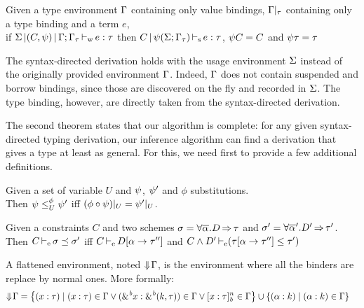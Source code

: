 \begin{theorem}
  Given a type environment $\E$ containing only value bindings,
  $\E|_\tau$ containing only a type binding and a term $e$,\\
  if $\inferW{\Sv}{(C,\unif)}{\E;\E_\tau}{e}{\tau}$
  then $\inferS{C}{\unif(\Sv;\E_\tau)}{e}{\tau}$, $\unif C = C$ and $\unif \tau = \tau$
\end{theorem}

The syntax-directed derivation holds with the usage environment $\Sv$ instead of the originally provided environment $\E$. Indeed,
$\E$ does not contain suspended and borrow bindings, since those
are discovered on the fly and recorded in $\Sv$. The type binding, however,
are directly taken from the syntax-directed derivation.

The second theorem states that our algorithm is complete: for any given
syntax-directed typing derivation, our inference algorithm can find
a derivation that gives a type at least as general.
For this, we need first to provide a few additional definitions.

\begin{definition}
  Given a set of variable $U$ and $\unif$, $\unif'$ and $\phi$
  substitutions. \\
  Then
  $\unif \leq^{\phi}_{U} \unif'$ iff $(\phi \circ \unif)|_{U} = \unif'|_U$.
\end{definition}

\begin{definition}
  Given a constraints $C$ and two schemes
  $\schm = \forall \Multi\tvar. \qual{D}{\tau}$ and
  $\schm' = \forall \Multi\tvar'. \qual{D'}{\tau'} $.
  Then $\entail{C}{\schm \preceq \schm'}$
  iff $\entail{C}{\subst{\tvar}{\tau''} D}$
  and $\entail{C\Cand D'}{\Cleq{\subst{\tvar}{\tau''}\tau}{\tau'}}$
\end{definition}

\begin{definition}
A flattened environment,
noted $\Eflat\E$, is the environment
where all the binders are replace by normal ones. More formally:
\begin{align*}
  \Eflat\E
  &= \left\{ \bvar{x}{\tau} \mid
    \bvar{x}{\tau}\in\E
    \vee \bvar{\borrow{x}}{\borrowty{k}{\tau}}\in\E
    \vee \svar{x}{\tau}^n\in\E
    \right\} \cup \left\{ \bvar{\tvar}{k} \mid \bvar{\tvar}{k}\in\E \right\}
\end{align*}
\end{definition}


